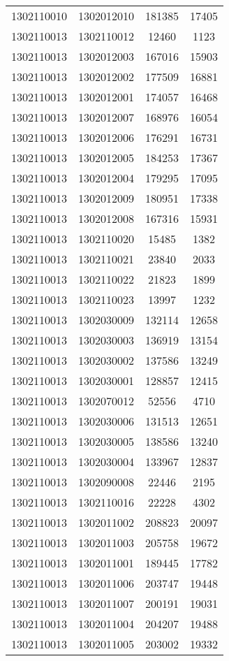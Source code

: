 \begin{longtable}{llcc}
1302110010 & 1302012010 & 181385 & 17405\\
1302110013 & 1302110012 & 12460 & 1123\\
1302110013 & 1302012003 & 167016 & 15903\\
1302110013 & 1302012002 & 177509 & 16881\\
1302110013 & 1302012001 & 174057 & 16468\\
1302110013 & 1302012007 & 168976 & 16054\\
1302110013 & 1302012006 & 176291 & 16731\\
1302110013 & 1302012005 & 184253 & 17367\\
1302110013 & 1302012004 & 179295 & 17095\\
1302110013 & 1302012009 & 180951 & 17338\\
1302110013 & 1302012008 & 167316 & 15931\\
1302110013 & 1302110020 & 15485 & 1382\\
1302110013 & 1302110021 & 23840 & 2033\\
1302110013 & 1302110022 & 21823 & 1899\\
1302110013 & 1302110023 & 13997 & 1232\\
1302110013 & 1302030009 & 132114 & 12658\\
1302110013 & 1302030003 & 136919 & 13154\\
1302110013 & 1302030002 & 137586 & 13249\\
1302110013 & 1302030001 & 128857 & 12415\\
1302110013 & 1302070012 & 52556 & 4710\\
1302110013 & 1302030006 & 131513 & 12651\\
1302110013 & 1302030005 & 138586 & 13240\\
1302110013 & 1302030004 & 133967 & 12837\\
1302110013 & 1302090008 & 22446 & 2195\\
1302110013 & 1302110016 & 22228 & 4302\\
1302110013 & 1302011002 & 208823 & 20097\\
1302110013 & 1302011003 & 205758 & 19672\\
1302110013 & 1302011001 & 189445 & 17782\\
1302110013 & 1302011006 & 203747 & 19448\\
1302110013 & 1302011007 & 200191 & 19031\\
1302110013 & 1302011004 & 204207 & 19488\\
1302110013 & 1302011005 & 203002 & 19332\\

\end{longtable}
